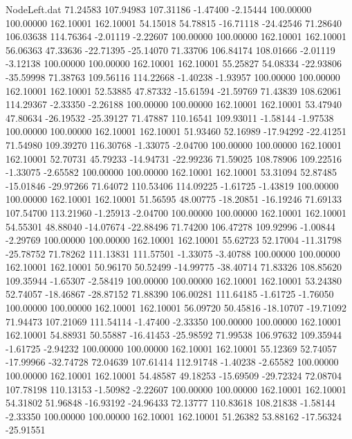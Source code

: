 \begin{filecontents}{NodeLeft.dat}
  71.24583  107.94983  107.31186    -1.47400   -2.15444  100.00000  100.00000  162.10001  162.10001   54.15018   54.78815  -16.71118  -24.42546
  71.28640  106.03638  114.76364    -2.01119   -2.22607  100.00000  100.00000  162.10001  162.10001   56.06363   47.33636  -22.71395  -25.14070
  71.33706  106.84174  108.01666    -2.01119   -3.12138  100.00000  100.00000  162.10001  162.10001   55.25827   54.08334  -22.93806  -35.59998
  71.38763  109.56116  114.22668    -1.40238   -1.93957  100.00000  100.00000  162.10001  162.10001   52.53885   47.87332  -15.61594  -21.59769
  71.43839  108.62061  114.29367    -2.33350   -2.26188  100.00000  100.00000  162.10001  162.10001   53.47940   47.80634  -26.19532  -25.39127
  71.47887  110.16541  109.93011    -1.58144   -1.97538  100.00000  100.00000  162.10001  162.10001   51.93460   52.16989  -17.94292  -22.41251
  71.54980  109.39270  116.30768    -1.33075   -2.04700  100.00000  100.00000  162.10001  162.10001   52.70731   45.79233  -14.94731  -22.99236
  71.59025  108.78906  109.22516    -1.33075   -2.65582  100.00000  100.00000  162.10001  162.10001   53.31094   52.87485  -15.01846  -29.97266
  71.64072  110.53406  114.09225    -1.61725   -1.43819  100.00000  100.00000  162.10001  162.10001   51.56595   48.00775  -18.20851  -16.19246
  71.69133  107.54700  113.21960    -1.25913   -2.04700  100.00000  100.00000  162.10001  162.10001   54.55301   48.88040  -14.07674  -22.88496
  71.74200  106.47278  109.92996    -1.00844   -2.29769  100.00000  100.00000  162.10001  162.10001   55.62723   52.17004  -11.31798  -25.78752
  71.78262  111.13831  111.57501    -1.33075   -3.40788  100.00000  100.00000  162.10001  162.10001   50.96170   50.52499  -14.99775  -38.40714
  71.83326  108.85620  109.35944    -1.65307   -2.58419  100.00000  100.00000  162.10001  162.10001   53.24380   52.74057  -18.46867  -28.87152
  71.88390  106.00281  111.64185    -1.61725   -1.76050  100.00000  100.00000  162.10001  162.10001   56.09720   50.45816  -18.10707  -19.71092
  71.94473  107.21069  111.54114    -1.47400   -2.33350  100.00000  100.00000  162.10001  162.10001   54.88931   50.55887  -16.41453  -25.98592
  71.99538  106.97632  109.35944    -1.61725   -2.94232  100.00000  100.00000  162.10001  162.10001   55.12369   52.74057  -17.99966  -32.74728
  72.04639  107.61414  112.91748    -1.40238   -2.65582  100.00000  100.00000  162.10001  162.10001   54.48587   49.18253  -15.69509  -29.72324
  72.08704  107.78198  110.13153    -1.50982   -2.22607  100.00000  100.00000  162.10001  162.10001   54.31802   51.96848  -16.93192  -24.96433
  72.13777  110.83618  108.21838    -1.58144   -2.33350  100.00000  100.00000  162.10001  162.10001   51.26382   53.88162  -17.56324  -25.91551

\end{filecontents}
